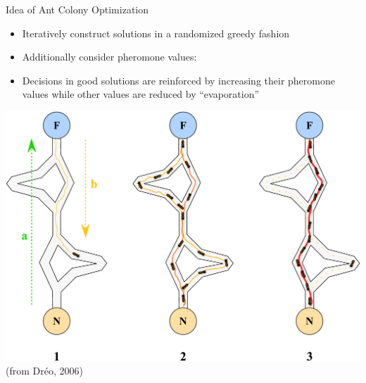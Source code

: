 \documentclass[aspectratio=1610]{beamer}
\newcommand{\important}[1]{{\color{green!60!black}#1}}
\renewcommand{\footnotesize}{\scriptsize}
\begin{document}
\begin{frame}{Idea of Ant Colony Optimization}
	\begin{itemize}
		\item Iteratively construct solutions in a randomized greedy fashion
		\item Additionally consider \important{pheromone values}:
		\item Decisions in good solutions are \important{reinforced} by increasing their pheromone values while other values are reduced by ``evaporation''
	\end{itemize}
	\begin{center}
		\includegraphics[width=0.4\linewidth]{figures/aco} \\
		{\footnotesize (from Dr\'eo, 2006)}

	\end{center}
\end{frame}


\end{document}
